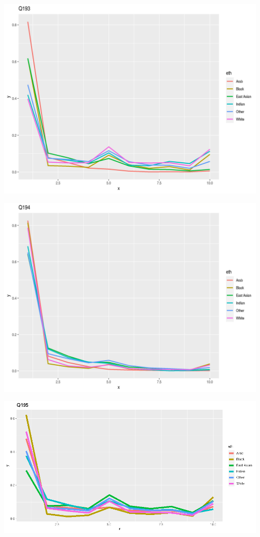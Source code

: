 \documentclass{amsart}
\begin{document}
\includegraphics[scale=0.7]{q193.jpeg}

\includegraphics[scale=0.7]{q194.jpeg}

\includegraphics[scale=0.7]{q195.jpeg}
\end{document}
